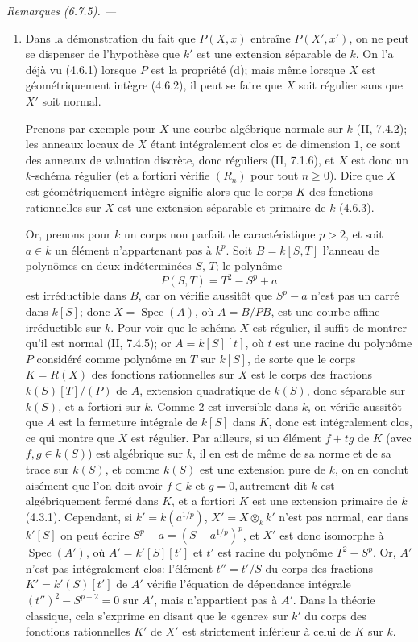 \documentclass[10pt,oneside]{book}
\newenvironment{remarks}[1][]{%
  \par\medskip\noindent\itshape Remarques (#1). ---\ }{\par}
\begin{document}
\begin{remarks}[6.7.5]
\label{IV.2.s6.7.5-fr}
\begin{enumerate}
\item[(i)] Dans la démonstration du fait que $P(X,x)$ entraîne
$P(X',x')$, on ne peut se dispenser de l'hypothèse que $k'$ est une
extension séparable de $k$. On l'a déjà vu (4.6.1) lorsque $P$ est la
propriété (d); mais même lorsque $X$ est géométriquement intègre (4.6.2),
il peut se faire que $X$ soit régulier sans que $X'$ soit normal.

Prenons par exemple pour $X$ une courbe algébrique normale sur $k$
(II, 7.4.2); les anneaux locaux de $X$ étant intégralement clos et de
dimension $1$, ce sont des anneaux de valuation discrète, donc réguliers
(II, 7.1.6), et $X$ est donc un $k$-schéma régulier (et a fortiori
vérifie $(R_n)$ pour tout $n\geqslant0$). Dire que $X$ est géométriquement
intègre signifie alors que le corps $K$ des fonctions rationnelles sur
$X$ est une extension séparable et primaire de $k$ (4.6.3).

Or, prenons pour $k$ un corps non parfait de caractéristique $p>2$, et
soit $a\in k$ un élément n'appartenant pas à $k^p$. Soit
$B=k[S,T]$ l'anneau de polynômes en deux indéterminées $S$, $T$; le
polynôme
\[
P(S,T)=T^2-S^p+a
\]
est irréductible dans $B$, car on vérifie aussitôt que $S^p-a$ n'est pas
un carré dans $k[S]$; donc $X=\operatorname{Spec}(A)$, où $A=B/PB$,
est une courbe affine irréductible sur $k$. Pour voir que le schéma $X$
est régulier, il suffit de montrer qu'il est normal (II, 7.4.5); or
$A=k[S][t]$, où $t$ est une racine du polynôme $P$ considéré comme
polynôme en $T$ sur $k[S]$, de sorte que le corps $K=R(X)$ des fonctions
rationnelles sur $X$ est le corps des fractions $k(S)[T]/(P)$ de $A$,
extension quadratique de $k(S)$, donc séparable sur $k(S)$, et a fortiori
sur $k$. Comme $2$ est inversible dans $k$, on vérifie aussitôt que $A$
est la fermeture intégrale de $k[S]$ dans $K$, donc est intégralement clos,
ce qui montre que $X$ est régulier. Par ailleurs, si un élément $f+tg$
de $K$ (avec $f,g\in k(S)$) est algébrique sur $k$, il en est de même de
sa norme et de sa trace sur $k(S)$, et comme $k(S)$ est une extension pure
de $k$, on en conclut aisément que l'on doit avoir $f\in k$ et $g=0,
$autrement dit $k$ est algébriquement fermé dans $K$, et a fortiori $K$
est une extension primaire de $k$ (4.3.1). Cependant, si
$k'=k(a^{1/p})$, $X'=X\otimes_k k'$ n'est pas normal, car dans $k'[S]$
on peut écrire $S^p-a=(S-a^{1/p})^p$, et $X'$ est donc isomorphe à
$\operatorname{Spec}(A')$, où $A'=k'[S][t']$ et $t'$ est racine du
polynôme $T^2-S^p$. Or, $A'$ n'est pas intégralement clos: l'élément
$t''=t'/S$ du corps des fractions $K'=k'(S)[t']$ de $A'$ vérifie
l'équation de dépendance intégrale $(t'')^2-S^{p-2}=0$ sur $A'$, mais
n'appartient pas à $A'$. Dans la théorie classique, cela s'exprime en
disant que le «genre» sur $k'$ du corps des fonctions rationnelles $K'$ de
$X'$ est strictement inférieur à celui de $K$ sur $k$.


\end{enumerate}
\end{remarks}
\end{document}
